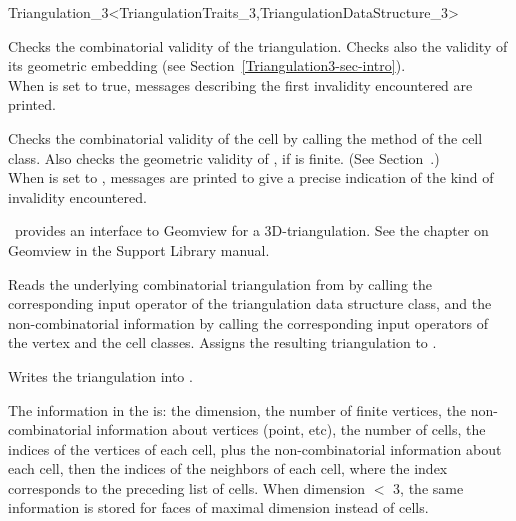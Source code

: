 \begin{ccRefClass}{Triangulation_3<TriangulationTraits_3,TriangulationDataStructure_3>}
\begin{ccAdvanced}
{Checks the combinatorial validity of the triangulation. Checks also the
validity of its geometric embedding (see
Section~\ref{Triangulation3-sec-intro}).\\ When  is set to true, 
messages describing the first invalidity encountered are printed.}

{Checks the combinatorial validity of the cell by calling the
 method of the  cell class. Also checks the
geometric validity of , if  is finite. (See
Section~\pageref{Triangulation3-sec-intro}.)\\ 
When  is set to , messages are printed to give
a precise indication of the kind of invalidity encountered.}

\end{ccAdvanced}


\cgal\ provides an interface to Geomview for a 3D-triangulation. 
See the chapter on Geomview in the Support Library manual.

{Reads the underlying combinatorial triangulation from  by
calling the corresponding input operator of the triangulation data
structure class, and the non-combinatorial information by calling the
corresponding input operators of the vertex and the cell
classes. Assigns the resulting triangulation to .}

{Writes the triangulation  into .}

The information in the  is: the dimension, the number of
finite vertices, the non-combinatorial information about vertices (point,
etc), the number of cells, the indices of the vertices of each cell,
plus the non-combinatorial information about each cell, 
then the indices of the neighbors of each cell, where the index
corresponds to the preceding list of cells. When dimension $<$ 3, the
same information is stored for faces of maximal dimension instead of
cells. 

\ccSeeAlso

\\


\end{ccRefClass}
